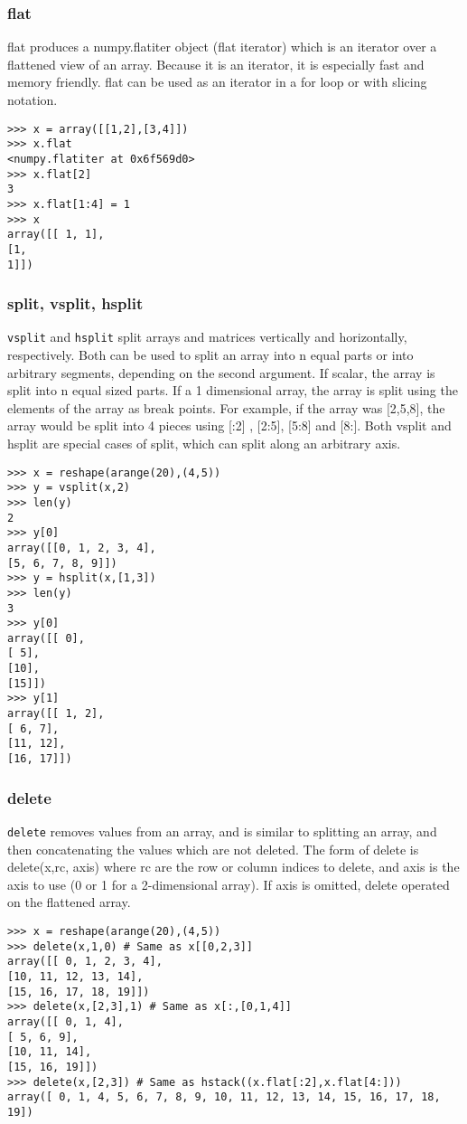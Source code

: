 \documentclass[KSmain.tex]{subfiles}
\begin{document}
\subsubsection{flat}
flat produces a numpy.flatiter object (flat iterator) which is an iterator over a flattened view of an array.
Because it is an iterator, it is especially fast and memory friendly. flat can be used as an iterator in a for
loop or with slicing notation.
\begin{framed}
\begin{verbatim}
>>> x = array([[1,2],[3,4]])
>>> x.flat
<numpy.flatiter at 0x6f569d0>
>>> x.flat[2]
3
>>> x.flat[1:4] = 1
>>> x
array([[ 1, 1],
[1,
1]])
\end{verbatim}
\end{framed}

\subsubsection{split, vsplit, hsplit}
\texttt{vsplit} and \texttt{hsplit} split arrays and matrices vertically and horizontally, respectively. Both can be used to
split an array into n equal parts or into arbitrary segments, depending on the second argument. If scalar,
the array is split into n equal sized parts. If a 1 dimensional array, the array is split using the elements of
the array as break points. For example, if the array was [2,5,8], the array would be split into 4 pieces using
[:2] , [2:5], [5:8] and [8:]. Both vsplit and hsplit are special cases of split, which can split along an
arbitrary axis.
\begin{framed}
\begin{verbatim}
>>> x = reshape(arange(20),(4,5))
>>> y = vsplit(x,2)
>>> len(y)
2
>>> y[0]
array([[0, 1, 2, 3, 4],
[5, 6, 7, 8, 9]])
>>> y = hsplit(x,[1,3])
>>> len(y)
3
>>> y[0]
array([[ 0],
[ 5],
[10],
[15]])
>>> y[1]
array([[ 1, 2],
[ 6, 7],
[11, 12],
[16, 17]])
\end{verbatim}
\end{framed}
\subsubsection{delete}
\texttt{delete} removes values from an array, and is similar to splitting an array, and then concatenating the values
which are not deleted. The form of delete is delete(x,rc, axis) where rc are the row or column indices to
delete, and axis is the axis to use (0 or 1 for a 2-dimensional array). If axis is omitted, delete operated on
the flattened array.
\begin{framed}
\begin{verbatim}
>>> x = reshape(arange(20),(4,5))
>>> delete(x,1,0) # Same as x[[0,2,3]]
array([[ 0, 1, 2, 3, 4],
[10, 11, 12, 13, 14],
[15, 16, 17, 18, 19]])
>>> delete(x,[2,3],1) # Same as x[:,[0,1,4]]
array([[ 0, 1, 4],
[ 5, 6, 9],
[10, 11, 14],
[15, 16, 19]])
>>> delete(x,[2,3]) # Same as hstack((x.flat[:2],x.flat[4:]))
array([ 0, 1, 4, 5, 6, 7, 8, 9, 10, 11, 12, 13, 14, 15, 16, 17, 18,
19])
\end{verbatim}
\end{framed}
\end{document}

